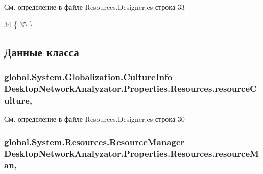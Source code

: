 См. определение в файле Resources.\+Designer.\+cs строка 33


\begin{DoxyCode}
34         \{
35         \}
\end{DoxyCode}


\subsection{Данные класса}
\subsubsection[{\texorpdfstring{resource\+Culture}{resourceCulture}}]{\setlength{\rightskip}{0pt plus 5cm}global.\+System.\+Globalization.\+Culture\+Info Desktop\+Network\+Analyzator.\+Properties.\+Resources.\+resource\+Culture\hspace{0.3cm}{\ttfamily [static]}, {\ttfamily [private]}}\hypertarget{class_desktop_network_analyzator_1_1_properties_1_1_resources_aa91c759e6d6809487e974b2dcf952baf}{}\label{class_desktop_network_analyzator_1_1_properties_1_1_resources_aa91c759e6d6809487e974b2dcf952baf}


См. определение в файле Resources.\+Designer.\+cs строка 30

\subsubsection[{\texorpdfstring{resource\+Man}{resourceMan}}]{\setlength{\rightskip}{0pt plus 5cm}global.\+System.\+Resources.\+Resource\+Manager Desktop\+Network\+Analyzator.\+Properties.\+Resources.\+resource\+Man\hspace{0.3cm}{\ttfamily [static]}, {\ttfamily [private]}}\hypertarget{class_desktop_network_analyzator_1_1_properties_1_1_resources_a48b43d29b73e2826f1a7f5fbf3182d96}{}\label{class_desktop_network_analyzator_1_1_properties_1_1_resources_a48b43d29b73e2826f1a7f5fbf3182d96}


